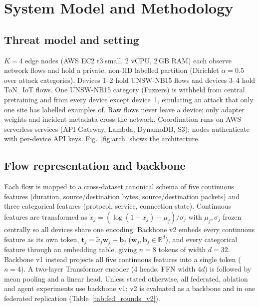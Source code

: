 
\section{System Model and Methodology}

\subsection{Threat model and setting}
$K{=}4$ edge nodes (AWS EC2 t3.small, 2 vCPU, 2\,GB RAM) each observe network
flows and hold a private, non-IID labelled partition (Dirichlet $\alpha{=}0.5$
over attack categories). Devices 1--2 hold UNSW-NB15 flows and devices 3--4
hold ToN\_IoT flows. One UNSW-NB15 category (Fuzzers) is withheld from central pretraining and
from every device except device~1, emulating an attack that only one site has
labelled examples of. Raw flows never leave a device; only adapter weights and
incident metadata cross the network. Coordination runs on AWS serverless
services (API Gateway, Lambda, DynamoDB, S3); nodes authenticate with
per-device API keys. Fig.~\ref{fig:arch} shows the architecture.

\subsection{Flow representation and backbone}
Each flow is mapped to a cross-dataset canonical schema of five continuous
features (duration, source/destination bytes, source/destination packets)
and three categorical features (protocol, service, connection state).
Continuous features are transformed as $\tilde x_j = (\log(1+x_j)-\mu_j)/\sigma_j$
with $\mu_j,\sigma_j$ frozen centrally so all devices share one encoding.
Backbone v2 embeds every continuous feature as its own token,
$\mathbf t_j = \tilde x_j \mathbf w_j + \mathbf b_j$ ($\mathbf w_j,\mathbf b_j\in\mathbb R^{d}$),
and every categorical feature through an embedding table, giving
$n{=}8$ tokens of width $d{=}32$. Backbone v1 instead projects all five
continuous features into a single token ($n{=}4$). A two-layer Transformer encoder
(4 heads, FFN width $4d$) is followed by mean pooling and a linear head.
Unless stated otherwise, all federated, ablation and agent experiments use
backbone v1; v2 is evaluated as a backbone and in one federated
replication (Table~\ref{tab:fed_rounds_v2}).

